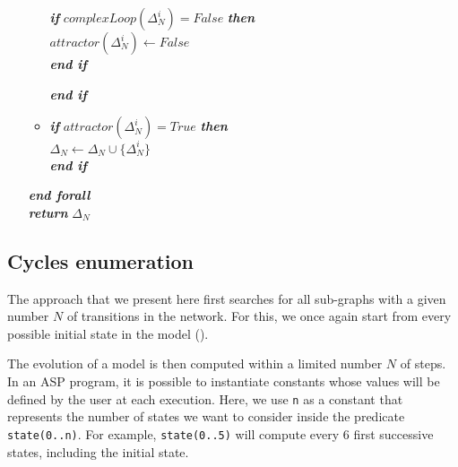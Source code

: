 \begin{algorithm}[p]
\begin{itemize}
\begin{itemize}
					\hspace{0.7cm} \textbf{\textit{if}} $complexLoop(\Delta_N^i) = False$ \textbf{\textit{then}}\\
						\hspace{1.2cm}  $attractor(\Delta_N^i) \longleftarrow False$\\
					\hspace{0.7cm} \textbf{\textit{end if}} 						
						
					\textbf{\textit{end if}} \\

					\item[] \textbf{\textit{if}} $attractor(\Delta_N^i) = True$ \textbf{\textit{then}}\\
					\hspace{0.5cm}  $\Delta_N \longleftarrow \Delta_N \cup \{ \Delta_N^i \}$ \\
					\textbf{\textit{end if}} 

				\end{itemize}		
			\hspace{0.2cm} \textbf{\textit{end forall}} \\		
			\hspace{0.2cm} \textbf{\textit{return}} $\Delta_N$		
	\end{itemize}
\end{algorithm}

\subsection{Cycles enumeration}
The approach that we present here first searches for all sub-graphs with a given number $N$ of transitions %
in the network.
For this, we once again start from every possible initial state in the model (). 

The evolution of a model is then computed within a limited number $N$ of steps. In an ASP program, it is possible to instantiate constants whose values will be defined by the user at each execution. Here, we use \texttt{n} as a constant that represents the number of states we want to consider
inside the predicate \texttt{state(0..n)}.
For example, \texttt{state(0..5)} will compute every 6 first successive states, including the initial state.

